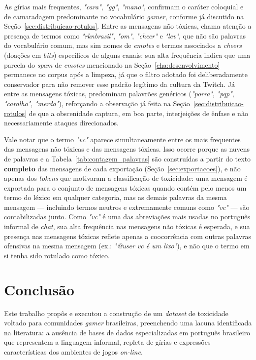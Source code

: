 \documentclass{eic-bcc-tcc}
\begin{document}
As gírias mais frequentes, \textit{"cara"}, \textit{"gg"}, \textit{"mano"}, confirmam o caráter coloquial e de camaradagem predominante no vocabulário \textit{gamer}, conforme já discutido na Seção~\ref{sec:distribuicao-rotulos}. Entre as mensagens não tóxicas, chama atenção a presença de termos como \textit{"rknbrasil"}, \textit{"om"}, \textit{"cheer"} e \textit{"lev"}, que não são palavras do vocabulário comum, mas sim nomes de \textit{emotes} e termos associados a \textit{cheers} (doações em \textit{bits}) específicos de alguns canais; sua alta frequência indica que uma parcela do \textit{spam} de \textit{emotes} mencionado na Seção~\ref{cha:desenvolvimento} permanece no corpus após a limpeza, já que o filtro adotado foi deliberadamente conservador para não remover esse padrão legítimo da cultura da Twitch. Já entre as mensagens tóxicas, predominam palavrões genéricos (\textit{"porra"}, \textit{"pqp"}, \textit{"caralho"}, \textit{"merda"}), reforçando a observação já feita na Seção~\ref{sec:distribuicao-rotulos} de que a obscenidade captura, em boa parte, interjeições de ênfase e não necessariamente ataques direcionados.

Vale notar que o termo \textit{"vc"} aparece simultaneamente entre os mais frequentes das mensagens não tóxicas e das mensagens tóxicas. Isso ocorre porque as nuvens de palavras e a Tabela~\ref{tab:contagem_palavras} são construídas a partir do texto \textbf{completo} das mensagens de cada exportação (Seção~\ref{sec:exportacoes}), e não apenas dos \textit{tokens} que motivaram a classificação de toxicidade: uma mensagem é exportada para o conjunto de mensagens tóxicas quando contém pelo menos um termo do léxico em qualquer categoria, mas as demais palavras da mesma mensagem — incluindo termos neutros e extremamente comuns como \textit{"vc"} — são contabilizadas junto. Como \textit{"vc"} é uma das abreviações mais usadas no português informal de \textit{chat}, sua alta frequência nas mensagens não tóxicas é esperada, e sua presença nas mensagens tóxicas reflete apenas a coocorrência com outras palavras ofensivas na mesma mensagem (ex.: \textit{"@user vc é um lixo"}), e não que o termo em si tenha sido rotulado como tóxico.

\chapter{Conclusão}
\label{cha:conclusao}

Este trabalho propôs e executou a construção de um \textit{dataset} de toxicidade voltado para comunidades \textit{gamer} brasileiras, preenchendo uma lacuna identificada na literatura: a ausência de bases de dados especializadas em português brasileiro que representem a linguagem informal, repleta de gírias e expressões características dos ambientes de jogos \textit{on-line}.
\end{document}
